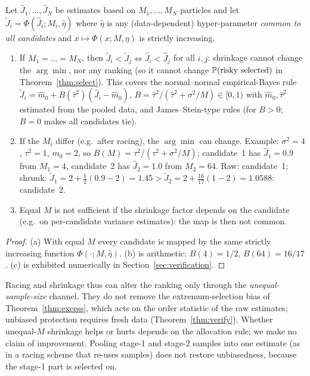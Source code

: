 \begin{proposition}\label{prop:shrink}
Let $\hat J_1,\dots,\hat J_N$ be estimates based on $M_1,\dots,M_N$ particles and let $\tilde J_i=\Phi(\hat J_i;M_i,\hat\eta)$ where $\hat\eta$ is any (data-dependent) hyper-parameter \emph{common to all candidates} and $x\mapsto\Phi(x;M,\eta)$ is strictly increasing.
\begin{enumerate}
\item[(a)] If $M_1=\dots=M_N$, then $\tilde J_i<\tilde J_j\iff\hat J_i<\hat J_j$ for all $i,j$: shrinkage cannot change the $\arg\min$, nor any ranking (so it cannot change $\mathbb{P}(\text{risky selected})$ in Theorem~\ref{thm:select}).
This covers the normal--normal empirical-Bayes rule $\tilde J_i=\hat m_0+B(\hat\tau^2)(\hat J_i-\hat m_0)$, $B=\hat\tau^2/(\hat\tau^2+\sigma^2/M)\in[0,1)$ with $\hat m_0,\hat\tau^2$ estimated from the pooled data, and James--Stein-type rules \cite{efron1973} (for $B>0$; $B=0$ makes all candidates tie).
\item[(b)] If the $M_i$ differ (e.g.\ after racing), the $\arg\min$ can change. Example: $\sigma^2=4$, $\tau^2=1$, $m_0=2$, so $B(M)=\tau^2/(\tau^2+\sigma^2/M)$; candidate~1 has $\hat J_1=0.9$ from $M_1=4$, candidate~2 has $\hat J_2=1.0$ from $M_2=64$. Raw: candidate~1; shrunk: $\tilde J_1=2+\tfrac12(0.9-2)=1.45>\tilde J_2=2+\tfrac{16}{17}(1-2)=1.0588$: candidate~2.
\item[(c)] Equal $M$ is not sufficient if the shrinkage factor depends on the candidate (e.g.\ on per-candidate variance estimates): the map is then not common.
\end{enumerate}
\end{proposition}
\begin{proof}
(a) With equal $M$ every candidate is mapped by the same strictly increasing function $\Phi(\cdot;M,\hat\eta)$. (b) is arithmetic: $B(4)=1/2$, $B(64)=16/17$. (c) is exhibited numerically in Section~\ref{sec:verification}.
\end{proof}

\begin{remark}
Racing and shrinkage thus can alter the ranking only through the \emph{unequal-sample-size} channel. They do not remove the extremum-selection bias of Theorem~\ref{thm:excess}, which acts on the order statistic of the raw estimates; unbiased protection requires fresh data (Theorem~\ref{thm:verify}). Whether unequal-$M$ shrinkage helps or hurts depends on the allocation rule; we make no claim of improvement.
Pooling stage-1 and stage-2 samples into one estimate (as in a racing scheme that re-uses samples) does not restore unbiasedness, because the stage-1 part is selected on.
\end{remark}

